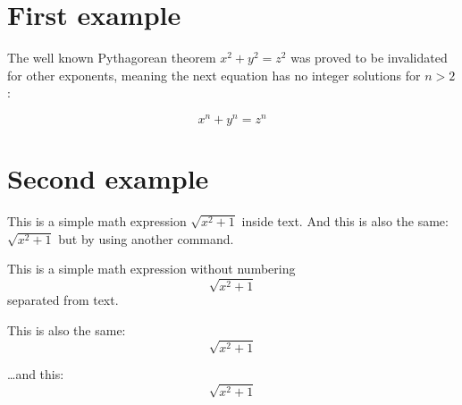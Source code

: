 \documentclass{article}
\begin{document}
	\section{First example}
	
	The well known Pythagorean theorem \(x^2 + y^2 = z^2\) was proved to be invalidated for other exponents, meaning the next equation has no integer solutions for \(n>2\):
	
	\[x^n + y^n = z^n\]
	
	\section{Second example}
	
	This is a simple math expression \(\sqrt{x^2 + 1}\) inside text.
	And this is also the same:
	\begin{math}
		\sqrt{x^2 + 1}
	\end{math}
	but by using another command.
	
	This is a simple math expression without numbering
	\[\sqrt{x^2 + 1}\]
	separated from text.
	
	This is also the same:
	\begin{displaymath}
		\sqrt{x^2 + 1}
	\end{displaymath}
	
	\ldots and this:
	\begin{equation*}
		\sqrt{x^2 + 1}
	\end{equation*}
\end{document}
